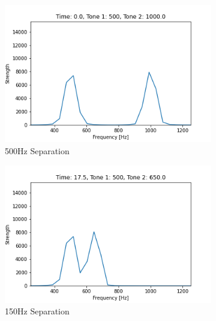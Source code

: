 \begin{figure}[h]
    \centering
    \caption{Distinctiveness of Two Increasingly Similar Tones}
    \label{fig:tone-sep}
    \begin{subfigure}{0.5\textwidth}
        \centering
        \caption{500Hz Separation}
        \label{fig:tone-sep-500}
        \includegraphics[width=.90\linewidth]{Figures/4 Protocol Design/Tone Distinctiveness/0.06.png}
        \vspace*{2mm}
    \end{subfigure}%
    \begin{subfigure}{0.5\textwidth}
        \centering
        \caption{150Hz Separation}
        \label{fig:tone-sep-150}
        \includegraphics[width=.90\linewidth]{Figures/4 Protocol Design/Tone Distinctiveness/17.53.png}
        \vspace*{2mm}
    \end{subfigure}\\
    \begin{subfigure}{0.5\textwidth}

\end{subfigure}
\end{figure}
